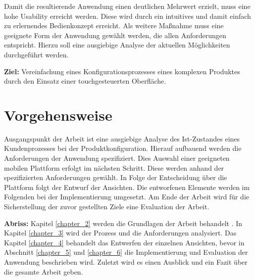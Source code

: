 Damit die resultierende Anwendung einen deutlichen Mehrwert erzielt, muss eine hohe Usability erreicht werden. Diese wird durch ein intuitives und damit einfach zu erlernendes Bedienkonzept erreicht. Als weitere Maßnahme muss eine geeignete Form der Anwendung gewählt werden, die allen Anforderungen entspricht. Hierzu soll eine ausgiebige Analyse der aktuellen Möglichkeiten durchgeführt werden.

\begin{mdframed}[backgroundcolor=gray!40,shadow=true,roundcorner=8pt]
\textbf{Ziel:} \newline
Vereinfachung eines Konfigurationsprozesses eines komplexen Produktes durch den Einsatz einer touchgesteuerten Oberfläche.
\end{mdframed}

\section{Vorgehensweise}
Ausgangspunkt der Arbeit ist eine ausgiebige Analyse des Ist-Zustandes eines Kundenprozesses bei der Produktkonfiguration. Hierauf aufbauend werden die Anforderungen der Anwendung spezifiziert. Dies Auswahl einer geeigneten mobilen Plattform erfolgt im nächsten Schritt. Diese werden anhand der spezifizierten Anforderungen gewählt. In Folge der Entscheidung über die Plattform folgt der Entwurf der Ansichten. Die entworfenen Elemente werden im Folgenden bei der Implementierung umgesetzt. Am Ende der Arbeit wird für die Sicherstellung der zuvor gestellten Ziele eine Evaluation der Arbeit. 
\par
\textbf{Abriss: }
Kapitel \ref{chapter_2} werden die Grundlagen der Arbeit behandelt . In Kapitel \ref{chapter_3} wird der Prozess und die Anforderungen analysiert. Das Kapitel \ref{chapter_4} behandelt das Entwerfen der einzelnen Ansichten, bevor in Abschnitt \ref{chapter_5} und \ref{chapter_6} die Implementierung und Evaluation der Anwendung beschrieben wird. Zuletzt wird es einen Ausblick und ein Fazit über die gesamte Arbeit geben.







